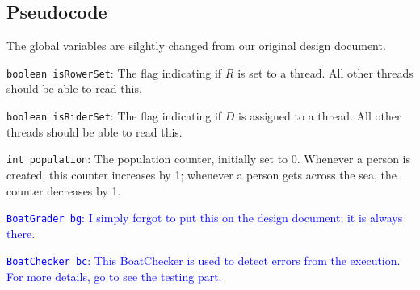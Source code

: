 \documentclass{article}
\begin{document}
\begin{spacing}{1.1}
\subsection{Pseudocode}
The global variables are silghtly changed from our original design document.\\
\begin{asparaitem}
  \item \texttt{boolean isRowerSet}: The flag indicating if $R$ is set to a thread. All other threads should be able to read this.\\ 
  \item \texttt{boolean isRiderSet}: The flag indicating if $D$ is assigned to a thread. All other threads should be able to read this.\\
  \item \texttt{int population}: The population counter, initially set to 0. Whenever a person is created, this counter increases by 1; whenever a person gets across the sea, the counter decreases by 1.\\
  \item \textcolor{blue}{\texttt{BoatGrader bg}: I simply forgot to put this on the design document; it is always there.}\\
  \item \textcolor{blue}{\texttt{BoatChecker bc}: This BoatChecker is used to detect errors from the execution. For more details, go to see the testing part.}\\
\end{asparaitem}


\end{spacing}
\end{document}

